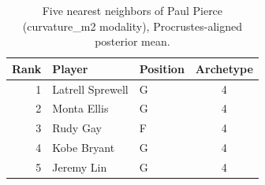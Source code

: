 \begin{table}[htbp]
  \centering\small
  \begin{tabular}{rllc}
    \toprule
    Rank & Player & Position & Archetype \\
    \midrule
    1 & Latrell Sprewell & G & 4 \\
    2 & Monta Ellis & G & 4 \\
    3 & Rudy Gay & F & 4 \\
    4 & Kobe Bryant & G & 4 \\
    5 & Jeremy Lin & G & 4 \\
    \bottomrule
  \end{tabular}
  \caption{Five nearest neighbors of Paul Pierce (curvature_m2 modality), Procrustes-aligned posterior mean.}
  \label{tab:Paul_Pierce_neighbors_curvature_m2}
\end{table}

